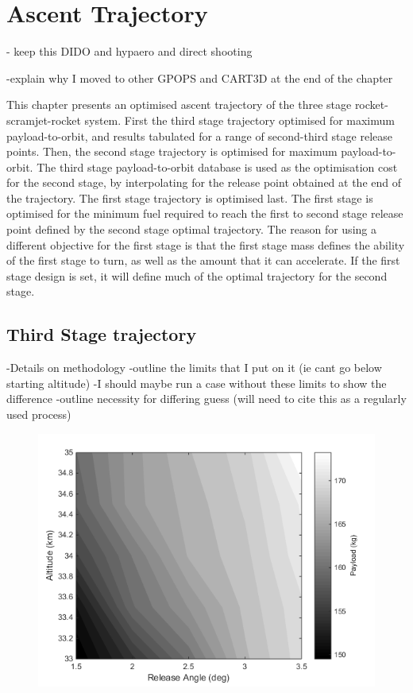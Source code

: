 
\cleardoublepage
\chapter{Ascent Trajectory}\label{chapter:numerical}


- keep this DIDO and hypaero and direct shooting

-explain why I moved to other GPOPS and CART3D at the end of the chapter


This chapter presents an optimised ascent trajectory of the three stage rocket-scramjet-rocket system. First the third stage trajectory optimised for maximum payload-to-orbit, and results tabulated for a range of second-third stage release points. Then, the second stage trajectory is optimised for maximum payload-to-orbit. The third stage payload-to-orbit database is used as the optimisation cost for the second stage, by interpolating for the release point obtained at the end of the trajectory. The first stage trajectory is optimised last. The first stage is optimised for the minimum fuel required to reach the first to second stage release point defined by the second stage optimal trajectory. The reason for using a different objective for the first stage is that the first stage mass defines the ability of the first stage to turn, as well as the amount that it can accelerate. If the first stage design is set, it will define much of the optimal trajectory for the second stage. 


\section{Third Stage trajectory}
-Details on methodology
-outline the limits that I put on it (ie cant go below starting altitude)
-I should maybe run a case without these limits to show the difference
-outline necessity for differing guess (will need to cite this as a regularly used process)
\begin{figure}
\centering
\includegraphics[width=0.7\linewidth]{figures/5_Ascent/contours}
\caption{}
\label{fig:contours}
\end{figure}

